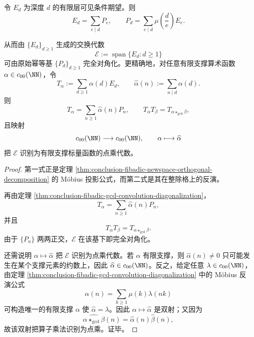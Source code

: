 \begin{theorem}\label{thm:conclusion-fibadic-visible-depth-mobius-primitive-semisimplicity}
令 \(E_d\) 为深度 \(d\) 的有限层可见条件期望。则
\[
E_d=\sum_{e\mid d}P_e,
\qquad
P_d=\sum_{e\mid d}\mu\!\left(\frac{d}{e}\right)E_e.
\]

从而由 \(\{E_d\}_{d\ge 1}\) 生成的交换代数
\[
\mathcal E:=\operatorname{span}\{E_d:d\ge 1\}
\]
可由原始幂等基 \(\{P_d\}_{d\ge 1}\) 完全对角化。更精确地，对任意有限支撑算术函数 \(\alpha\in c_{00}(\NN)\)，令
\[
T_\alpha:=\sum_{d\ge 1}\alpha(d)E_d,
\qquad
\widehat\alpha(n):=\sum_{n\mid d}\alpha(d).
\]
则
\[
T_\alpha=\sum_{n\ge 1}\widehat\alpha(n)P_n,
\qquad
T_\alpha T_\beta=T_{\alpha\star_{\gcd}\beta},
\]
且映射
\[
c_{00}(\NN)\longrightarrow c_{00}(\NN),
\qquad
\alpha\longmapsto \widehat\alpha
\]
把 \(\mathcal E\) 识别为有限支撑标量函数的点乘代数。
\end{theorem}
\begin{proof}
第一式正是定理 \ref{thm:conclusion-fibadic-newspace-orthogonal-decomposition} 的 Möbius 投影公式，而第二式是其在整除格上的反演。

再由定理 \ref{thm:conclusion-fibadic-gcd-convolution-diagonalization}，
\[
T_\alpha=\sum_{n\ge 1}\widehat\alpha(n)P_n,
\]
并且
\[
T_\alpha T_\beta=T_{\alpha\star_{\gcd}\beta}.
\]
由于 \(\{P_n\}\) 两两正交，\(\mathcal E\) 在该基下即完全对角化。

还需说明 \(\alpha\mapsto \widehat\alpha\) 把 \(\mathcal E\) 识别为点乘代数。若 \(\alpha\) 有限支撑，则 \(\widehat\alpha(n)\neq 0\) 只可能发生在某个支撑元素的约数上，因此 \(\widehat\alpha\in c_{00}(\NN)\)。反之，给定任意 \(\lambda\in c_{00}(\NN)\)，由定理 \ref{thm:conclusion-fibadic-gcd-convolution-diagonalization} 中的 Möbius 反演公式
\[
\alpha(n)=\sum_{k\ge 1}\mu(k)\lambda(nk)
\]
可构造唯一的有限支撑 \(\alpha\) 使 \(\widehat\alpha=\lambda\)。因此 \(\alpha\mapsto \widehat\alpha\) 是双射；又因为
\[
\widehat{\alpha\star_{\gcd}\beta}(n)=\widehat\alpha(n)\widehat\beta(n),
\]
故该双射把算子乘法识别为点乘。证毕。
\end{proof}

